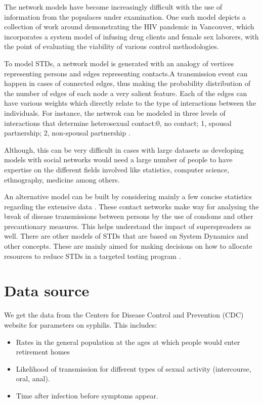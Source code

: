 \documentclass{article}
\begin{document}
\begin{normalsize}
     The network models have become increasingly difficult with the use of information from the populaces under examination. One such model depicts a collection of work around demonstrating the HIV pandemic in Vancouver, which incorporates a system model of infusing drug clients and female sex laborers, with the point of evaluating the viability of various control methodologies. 
     
     To model STDs, a network model is generated with an analogy of vertices representing persons and edges representing contacts.A transmission event can happen in cases of connected edges, thus making the probability distribution of the number of edges of each node a very salient feature. Each of the edges can have various weights which directly relate to the type of interactions between the individuals. For instance, the netwrok can be modeled in three levels of interactions that determine heterosexual contact:0, no contact; 1, spousal partnership; 2, non-spousal partnership \cite{c030e9dad6134c6e9a9d18e61b852e99}.


	Although, this can be very difficult in cases with large datasets as developing models with social networks would need a large number of people to have expertise on the different fields involved like statistics, computer science, ethnography, medicine among others. 
	
	An alternative model can be built by considering mainly a few concise statistics regarding the extensive data \cite{dataset}. These contact networks make way for analysing the break of disease transmissions between persons by the use of condoms and other precautionary measures. This helps understand the impact of superspreaders as well. There are other models of STDs that are based on System Dynamics and other concepts. These are mainly aimed for making decisions on how to allocate resources to reduce STDs in a targeted testing program \cite{Kok2015}.

     \section{Data source}
    We get the data from the Centers for Disease Control and Prevention (CDC) website for parameters on syphilis. This includes:
    \begin{itemize}
    \item Rates in the general population at the ages at which people would enter retirement homes
   	\item Likelihood of transmission for different types of sexual activity (intercourse, oral, anal).
   	\item Time after infection before symptoms appear.
   	\end{itemize}
   	

\end{normalsize}
\end{document}
